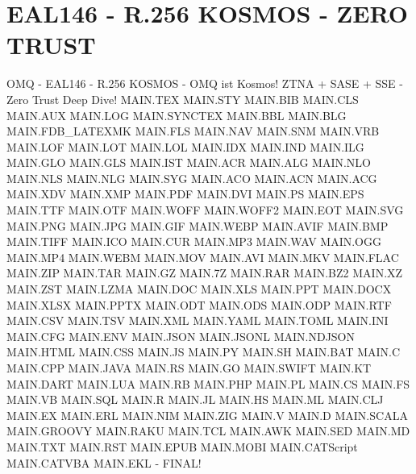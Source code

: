 \documentclass{MAIN}
\begin{document}
\section*{EAL146 - R.256 KOSMOS - ZERO TRUST}
OMQ - EAL146 - R.256 KOSMOS - OMQ ist Kosmos!
ZTNA + SASE + SSE - Zero Trust Deep Dive!
MAIN.TEX MAIN.STY MAIN.BIB MAIN.CLS MAIN.AUX MAIN.LOG MAIN.SYNCTEX MAIN.BBL MAIN.BLG MAIN.FDB_LATEXMK MAIN.FLS MAIN.NAV MAIN.SNM MAIN.VRB MAIN.LOF MAIN.LOT MAIN.LOL MAIN.IDX MAIN.IND MAIN.ILG MAIN.GLO MAIN.GLS MAIN.IST MAIN.ACR MAIN.ALG MAIN.NLO MAIN.NLS MAIN.NLG MAIN.SYG MAIN.ACO MAIN.ACN MAIN.ACG MAIN.XDV MAIN.XMP MAIN.PDF MAIN.DVI MAIN.PS MAIN.EPS MAIN.TTF MAIN.OTF MAIN.WOFF MAIN.WOFF2 MAIN.EOT MAIN.SVG MAIN.PNG MAIN.JPG MAIN.GIF MAIN.WEBP MAIN.AVIF MAIN.BMP MAIN.TIFF MAIN.ICO MAIN.CUR MAIN.MP3 MAIN.WAV MAIN.OGG MAIN.MP4 MAIN.WEBM MAIN.MOV MAIN.AVI MAIN.MKV MAIN.FLAC MAIN.ZIP MAIN.TAR MAIN.GZ MAIN.7Z MAIN.RAR MAIN.BZ2 MAIN.XZ MAIN.ZST MAIN.LZMA MAIN.DOC MAIN.XLS MAIN.PPT MAIN.DOCX MAIN.XLSX MAIN.PPTX MAIN.ODT MAIN.ODS MAIN.ODP MAIN.RTF MAIN.CSV MAIN.TSV MAIN.XML MAIN.YAML MAIN.TOML MAIN.INI MAIN.CFG MAIN.ENV MAIN.JSON MAIN.JSONL MAIN.NDJSON MAIN.HTML MAIN.CSS MAIN.JS MAIN.PY MAIN.SH MAIN.BAT MAIN.C MAIN.CPP MAIN.JAVA MAIN.RS MAIN.GO MAIN.SWIFT MAIN.KT MAIN.DART MAIN.LUA MAIN.RB MAIN.PHP MAIN.PL MAIN.CS MAIN.FS MAIN.VB MAIN.SQL MAIN.R MAIN.JL MAIN.HS MAIN.ML MAIN.CLJ MAIN.EX MAIN.ERL MAIN.NIM MAIN.ZIG MAIN.V MAIN.D MAIN.SCALA MAIN.GROOVY MAIN.RAKU MAIN.TCL MAIN.AWK MAIN.SED MAIN.MD MAIN.TXT MAIN.RST MAIN.EPUB MAIN.MOBI MAIN.CATScript MAIN.CATVBA MAIN.EKL - FINAL!
\end{document}
